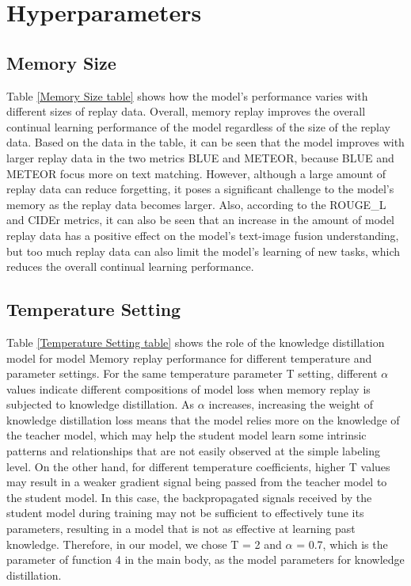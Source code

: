 \clearpage
\setcounter{page}{1}
\maketitlesupplementary


\section{Hyperparameters}
\label{sec:hyperparameters}


\subsection{Memory Size} Table \ref{Memory Size table} shows how the model's performance varies with different sizes of replay data. Overall, memory replay improves the overall continual learning performance of the model regardless of the size of the replay data. Based on the data in the table, it can be seen that the model improves with larger replay data in the two metrics BLUE and METEOR, because BLUE and METEOR focus more on text matching. However, although a large amount of replay data can reduce forgetting, it poses a significant challenge to the model's memory as the replay data becomes larger. Also, according to the ROUGE\_L and CIDEr metrics, it can also be seen that an increase in the amount of model replay data has a positive effect on the model's text-image fusion understanding, but too much replay data can also limit the model's learning of new tasks, which reduces the overall continual learning performance.




\subsection{Temperature Setting}
Table \ref{Temperature Setting table} shows the role of the knowledge distillation model for model Memory replay performance for different temperature and parameter settings. For the same temperature parameter T setting, different $\alpha$ values indicate different compositions of model loss when memory replay is subjected to knowledge distillation. As $\alpha$ increases, increasing the weight of knowledge distillation loss means that the model relies more on the knowledge of the teacher model, which may help the student model learn some intrinsic patterns and relationships that are not easily observed at the simple labeling level. On the other hand, for different temperature coefficients, higher T values may result in a weaker gradient signal being passed from the teacher model to the student model. In this case, the backpropagated signals received by the student model during training may not be sufficient to effectively tune its parameters, resulting in a model that is not as effective at learning past knowledge. Therefore, in our model, we chose T = 2 and $\alpha$ = 0.7, which is the parameter of function 4 in the main body, as the model parameters for knowledge distillation.






